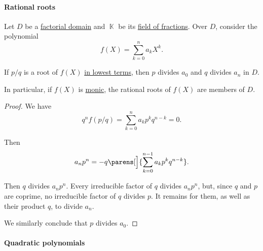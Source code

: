 \paragraph{Rational roots}

\begin{theorem}\label{thm:rational_root_test}
  Let \( D \) be a \hyperref[def:factorial_domain]{factorial domain} and \( \BbbK \) be its \hyperref[def:field_of_fractions]{field of fractions}. Over \( D \), consider the polynomial
  \begin{equation*}
    f(X) = \sum_{k=0}^n a_k X^k.
  \end{equation*}

  If \( p / q \) is a root of \( f(X) \) \hyperref[def:lowest_terms]{in lowest terms}, then \( p \) divides \( a_0 \) and \( q \) divides \( a_n \) in \( D \).
\end{theorem}
\begin{comments}
  \item In particular, if \( f(X) \) is \hyperref[def:monic_polynomial]{monic}, the rational roots of \( f(X) \) are members of \( D \).
\end{comments}
\begin{proof}
  We have
  \begin{equation*}
    q^n f(p / q)
    =
    \sum_{k=0}^n a_k p^k q^{n-k}
    =
    0.
  \end{equation*}

  Then
  \begin{equation*}
    a_n p^n = -q \parens[\Big]{ \sum_{k=0}^{n-1} a_k p^k q^{n-k} }.
  \end{equation*}

  Then \( q \) divides \( a_n p^n \). Every irreducible factor of \( q \) divides \( a_n p^n \), but, since \( q \) and \( p \) are coprime, no irreducible factor of \( q \) divides \( p \). It remains for them, as well as their product \( q \), to divide \( a_n \).

  We similarly conclude that \( p \) divides \( a_0 \).
\end{proof}

\paragraph{Quadratic polynomials}

